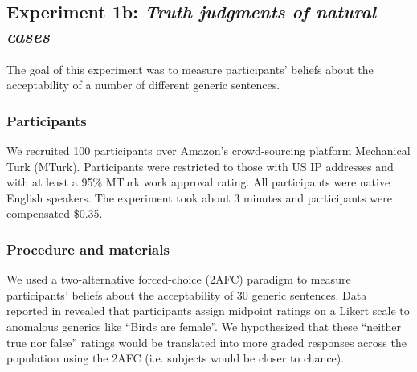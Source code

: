 \documentclass[10pt,letterpaper]{article}
\newcommand{\red}[1]{\textcolor{Red}{#1}}
\begin{document}


\subsection{Experiment 1b: \emph{Truth judgments of natural cases}}

The goal of this experiment was to measure participants' beliefs about the acceptability of a number of different generic sentences. 


\subsubsection{Participants}

We recruited 100 participants over Amazon's crowd-sourcing platform Mechanical Turk (MTurk).  Participants were restricted to those with US IP addresses and with at least a 95\% MTurk work approval rating. All participants were native English speakers. The experiment took about 3 minutes and participants were compensated \$0.35.

\subsubsection{Procedure and materials}

We used a two-alternative forced-choice (2AFC) paradigm to measure participants' beliefs about the acceptability of 30 generic sentences. 
Data reported in  revealed that participants assign midpoint ratings on a Likert scale to anomalous generics like ``Birds are female''. 
We hypothesized that these ``neither true nor false'' ratings would be translated into more graded responses across the population using the 2AFC (i.e. subjects would be closer to chance).
\end{document}
